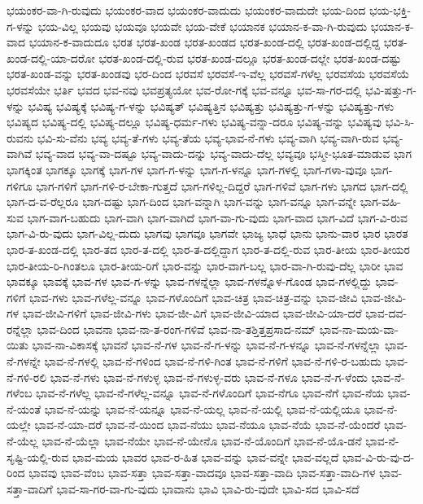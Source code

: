 {ಭಯಂಕರ-ವಾ-ಗಿ-ರುವುದು
ಭಯಂಕರ-ವಾದ
ಭಯಂಕರ-ವಾದುದು
ಭಯಂಕರ-ವಾದುದೇ
ಭಯ-ದಿಂದ
ಭಯ-ಭಕ್ತಿ-ಗ-ಳನ್ನು
ಭಯ-ವಿಲ್ಲ
ಭಯವು
ಭಯವೂ
ಭಯವೇ
ಭಯ-ವೇಕೆ
ಭಯಾನಕ
ಭಯಾನ-ಕ-ವಾ-ಗಿ-ರುವುದು
ಭಯಾನ-ಕ-ವಾದ
ಭಯಾನ-ಕ-ವಾದುದೂ
ಭರತ
ಭರತ-ಖಂಡ
ಭರತ-ಖಂಡದ
ಭರತ-ಖಂಡ-ದಲ್ಲಿ
ಭರತ-ಖಂಡ-ದಲ್ಲಿದ್ದ
ಭರತ-ಖಂಡ-ದಲ್ಲಿ-ಯಾ-ದರೋ
ಭರತ-ಖಂಡ-ದಲ್ಲಿ-ರುವ
ಭರತ-ಖಂಡ-ದಲ್ಲೂ
ಭರತ-ಖಂಡ-ದಲ್ಲೇ
ಭರತ-ಖಂಡ-ದಷ್ಟು
ಭರತ-ಖಂಡ-ವನ್ನು
ಭರತ-ಖಂಡವು
ಭರ-ದಿಂದ
ಭರವಸೆ
ಭರವಸೆ-ಇ-ವೆಲ್ಲ
ಭರವಸೆ-ಗಳೆಲ್ಲ
ಭರವಸೆಯ
ಭರವಸೆಯೆ
ಭರವಸೆಯೇ
ಭರ್ತಿ
ಭವದ
ಭವ-ನವು
ಭವಪ್ರತ್ಯಯೋ
ಭವ-ರೋ-ಗಕ್ಕೆ
ಭವ-ವನ್ನೂ
ಭವ-ಸಾ-ಗರ-ದಲ್ಲಿ
ಭವಿ-ಷತ್ತು-ಗ-ಳನ್ನು
ಭವಿಷ್ಯ
ಭವಿಷ್ಯಕ್ಕೆ
ಭವಿಷ್ಯ-ಗ-ಳನ್ನು
ಭವಿಷ್ಯತ್
ಭವಿಷ್ಯತ್ತಿನ
ಭವಿಷ್ಯತ್ತು
ಭವಿಷ್ಯತ್ತು-ಗ-ಳನ್ನು
ಭವಿಷ್ಯತ್ತು-ಗಳು
ಭವಿಷ್ಯದ
ಭವಿಷ್ಯ-ದಲ್ಲಿ
ಭವಿಷ್ಯ-ದಲ್ಲೂ
ಭವಿಷ್ಯ-ಧರ್ಮ-ಗಳು
ಭವಿಷ್ಯ-ವನ್ನಾ-ದರೂ
ಭವಿಷ್ಯ-ವನ್ನು
ಭವಿಷ್ಯವು
ಭವಿ-ಸಿ-ರುವನು
ಭವಿ-ಸು-ವೆನು
ಭವ್ಯ
ಭವ್ಯ-ತೆ-ಗಳು
ಭವ್ಯ-ತೆಯ
ಭವ್ಯ-ಭಾವ-ನೆ-ಗಳು
ಭವ್ಯ-ವಾಗಿ
ಭವ್ಯ-ವಾಗಿ-ರುವ
ಭವ್ಯ-ವಾಗಿವೆ
ಭವ್ಯ-ವಾದ
ಭವ್ಯ-ವಾ-ದಷ್ಟೂ
ಭವ್ಯ-ವಾದು-ದನ್ನು
ಭವ್ಯ-ವಾದು-ದೆಲ್ಲ
ಭವ್ಯವೂ
ಭಸ್ಮೀ-ಭೂತ-ಮಾಡುವ
ಭಾಗ
ಭಾಗಕ್ಕಿಂತ
ಭಾಗಕ್ಕೂ
ಭಾಗಕ್ಕೆ
ಭಾಗ-ಗಳ
ಭಾಗ-ಗ-ಳನ್ನು
ಭಾಗ-ಗ-ಳನ್ನೂ
ಭಾಗ-ಗಳಲ್ಲಿ
ಭಾಗ-ಗಳಾ-ವುವೂ
ಭಾಗ-ಗಳಿಗೂ
ಭಾಗ-ಗಳಿಗೆ
ಭಾಗ-ಗಳಿ-ರ-ಬೇಕಾ-ಗುತ್ತದೆ
ಭಾಗ-ಗಳಿಲ್ಲ-ದಿದ್ದರೆ
ಭಾಗ-ಗಳಿವೆ
ಭಾಗ-ಗಳು
ಭಾಗದ
ಭಾಗ-ದಲ್ಲಿ
ಭಾಗ-ದ-ವ-ರೆಲ್ಲರೂ
ಭಾಗ-ದಷ್ಟು
ಭಾಗ-ದಿಂದ
ಭಾಗ-ವನ್ನಾಗಿ
ಭಾಗ-ವನ್ನು
ಭಾಗ-ವನ್ನೂ
ಭಾಗ-ವನ್ನೇ
ಭಾಗ-ವಹಿ-ಸುವ
ಭಾಗ-ವಾಗ-ಬಹುದು
ಭಾಗ-ವಾಗಿ
ಭಾಗ-ವಾಗಿದೆ
ಭಾಗ-ವಾ-ಗು-ವುದು
ಭಾಗ-ವಾದ
ಭಾಗ-ವಿದೆ
ಭಾಗ-ವಿ-ರುವ
ಭಾಗ-ವಿ-ರು-ವುದು
ಭಾಗ-ವಿಲ್ಲ-ದುದು
ಭಾಗವು
ಭಾಗವೂ
ಭಾಗವೇ
ಭಾಜ್ಯ
ಭಾಧೆ
ಭಾನು
ಭಾನು-ವಾರ
ಭಾರ
ಭಾರತ
ಭಾರ-ತ-ಖಂಡ-ದಲ್ಲಿ
ಭಾರ-ತದ
ಭಾರ-ತ-ದಲ್ಲಿ
ಭಾರ-ತ-ದಲ್ಲಿದ್ದಾಗ
ಭಾರ-ತ-ದಲ್ಲಿ-ರುವ
ಭಾರ-ತೀಯ
ಭಾರ-ತೀಯರ
ಭಾರ-ತೀಯ-ರಿ-ಗಿಂತಲೂ
ಭಾರ-ತೀಯ-ರಿಗೆ
ಭಾರ-ವನ್ನು
ಭಾರ-ವಾಗ-ಬಲ್ಲ
ಭಾರ-ವಾ-ಗಿ-ರುವು-ದೆಲ್ಲ
ಭಾರೀ
ಭಾವ
ಭಾವಕ್ಕೂ
ಭಾವಕ್ಕೆ
ಭಾವ-ಗಳ
ಭಾವ-ಗ-ಳನ್ನು
ಭಾವ-ಗಳನ್ನೆಲ್ಲಾ
ಭಾವ-ಗಳನ್ನೊಳ-ಗೊಂಡ
ಭಾವ-ಗಳಲ್ಲಿದ್ದು
ಭಾವ-ಗಳಿಗೆ
ಭಾವ-ಗಳು
ಭಾವ-ಗಳೆಲ್ಲ-ವನ್ನೂ
ಭಾವ-ಗಳೊಂದಿಗೆ
ಭಾವ-ಚಿತ್ರ
ಭಾವ-ಚಿತ್ರ-ವನ್ನು
ಭಾವ-ಜೀವಿ
ಭಾವ-ಜೀವಿ-ಗಳ
ಭಾವ-ಜೀವಿ-ಗಳಿಗೆ
ಭಾವ-ಜೀವಿ-ಗಳು
ಭಾವ-ಜೀ-ವಿಗೆ
ಭಾವ-ಜೀವಿ-ಯಾದ
ಭಾವ-ಜೀವಿ-ಯಾ-ದರೆ
ಭಾವ-ದವ-ರನ್ನೆಲ್ಲಾ
ಭಾವ-ದಿಂದ
ಭಾವನಾ
ಭಾವ-ನಾ-ತ-ರಂಗ-ಗಳಿವೆ
ಭಾವ-ನಾ-ತಶ್ತಿತ್ತಪ್ರಸಾದ-ನಮ್
ಭಾವ-ನಾ-ಮಯ-ವಾ-ಯಿತು
ಭಾವ-ನಾ-ವಿಕಾಸಕ್ಕೆ
ಭಾವನೆ
ಭಾವ-ನೆ-ಗಳ
ಭಾವ-ನೆ-ಗ-ಳನ್ನು
ಭಾವ-ನೆ-ಗ-ಳನ್ನೂ
ಭಾವ-ನೆ-ಗಳನ್ನೆಲ್ಲಾ
ಭಾವ-ನೆ-ಗಳನ್ನೇ
ಭಾವ-ನೆ-ಗಳಲ್ಲಿ
ಭಾವ-ನೆ-ಗಳಿಂದ
ಭಾವ-ನೆ-ಗಳಿ-ಗಿಂತ
ಭಾವ-ನೆ-ಗಳಿಗೆ
ಭಾವ-ನೆ-ಗಳಿ-ರ-ಬಹುದು
ಭಾವ-ನೆ-ಗಳಿ-ರಲಿ
ಭಾವ-ನೆ-ಗಳು
ಭಾವ-ನೆ-ಗಳುಳ್ಳ
ಭಾವ-ನೆ-ಗಳುಳ್ಳ-ವರು
ಭಾವ-ನೆ-ಗಳೂ
ಭಾವ-ನೆ-ಗ-ಳೆಂದು
ಭಾವ-ನೆ-ಗಳೆಂಬ
ಭಾವ-ನೆ-ಗಳೆಲ್ಲ
ಭಾವ-ನೆ-ಗಳೆಲ್ಲ-ವನ್ನೂ
ಭಾವ-ನೆ-ಗಳೊಂದಿಗೆ
ಭಾವ-ನೆಗೂ
ಭಾವ-ನೆಗೆ
ಭಾವ-ನೆಯ
ಭಾವ-ನೆ-ಯಂತೆ
ಭಾವ-ನೆ-ಯನ್ನು
ಭಾವ-ನೆ-ಯನ್ನೂ
ಭಾವ-ನೆ-ಯಲ್ಲ
ಭಾವ-ನೆ-ಯಲ್ಲಿ
ಭಾವ-ನೆ-ಯಲ್ಲಿಯೂ
ಭಾವ-ನೆ-ಯಲ್ಲೇ
ಭಾವ-ನೆ-ಯಾ-ದರೆ
ಭಾವ-ನೆ-ಯಿಂದ
ಭಾವ-ನೆಯು
ಭಾವ-ನೆಯೂ
ಭಾವ-ನೆಯೆ
ಭಾವ-ನೆ-ಯೆಂದರೆ
ಭಾವ-ನೆ-ಯೆಲ್ಲ
ಭಾವ-ನೆ-ಯೆಲ್ಲಾ
ಭಾವ-ನೆಯೇ
ಭಾವ-ನೆ-ಯೇನೊ
ಭಾವ-ನೆ-ಯೊಂದಿಗೆ
ಭಾವ-ನೆ-ಯೊ-ಡನೆ
ಭಾವ-ನೆ-ಸೃಷ್ಟಿ-ಯಲ್ಲಿ-ರುವ
ಭಾವ-ಮಯ
ಭಾವರ
ಭಾವ-ರ-ಹಿತ
ಭಾವ-ವನ್ನು
ಭಾವ-ವನ್ನೇ
ಭಾವ-ವಲ್ಲದೆ
ಭಾವ-ವಿ-ರು-ವು-ದ-ರಿಂದ
ಭಾವವು
ಭಾವ-ವೆಂಬ
ಭಾವ-ಸತ್ತಾ
ಭಾವ-ಸತ್ತಾ-ವಾದವೂ
ಭಾವ-ಸತ್ತಾ-ವಾದಿ
ಭಾವ-ಸತ್ತಾ-ವಾದಿ-ಗಳ
ಭಾವ-ಸತ್ತಾ-ವಾದಿಗೆ
ಭಾವ-ಸಾ-ಗರ-ವಾ-ಗು-ವುದು
ಭಾವಾನು
ಭಾವಿ
ಭಾವಿ-ರು-ವುದೇ
ಭಾವಿ-ಸದ
ಭಾವಿ-ಸದೆ
}
